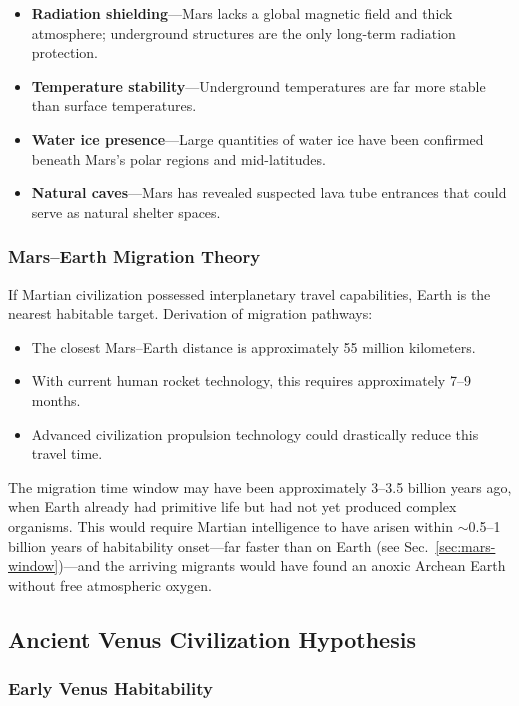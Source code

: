 \documentclass[aps,prd,twocolumn,superscriptaddress,nofootinbib]{revtex4-2}
\begin{document}
\begin{itemize}
  \item \textbf{Radiation shielding}---Mars lacks a global magnetic field and thick atmosphere; underground structures are the only long-term radiation protection.
  \item \textbf{Temperature stability}---Underground temperatures are far more stable than surface temperatures.
  \item \textbf{Water ice presence}---Large quantities of water ice have been confirmed beneath Mars's polar regions and mid-latitudes.
  \item \textbf{Natural caves}---Mars has revealed suspected lava tube entrances that could serve as natural shelter spaces.
\end{itemize}

\subsubsection{Mars--Earth Migration Theory}\label{sec:mars-earth-migration}

If Martian civilization possessed interplanetary travel capabilities, Earth is the nearest habitable target. Derivation of migration pathways:

\begin{itemize}
  \item The closest Mars--Earth distance is approximately 55 million kilometers.
  \item With current human rocket technology, this requires approximately 7--9 months.
  \item Advanced civilization propulsion technology could drastically reduce this travel time.
\end{itemize}

The migration time window may have been approximately 3--3.5 billion years ago, when Earth already had primitive life but had not yet produced complex organisms. This would require Martian intelligence to have arisen within ${\sim}$0.5--1 billion years of habitability onset---far faster than on Earth (see Sec.~\ref{sec:mars-window})---and the arriving migrants would have found an anoxic Archean Earth without free atmospheric oxygen.

\subsection{Ancient Venus Civilization Hypothesis}\label{sec:venus-civ}

\subsubsection{Early Venus Habitability}\label{sec:venus-habit}
\end{document}
